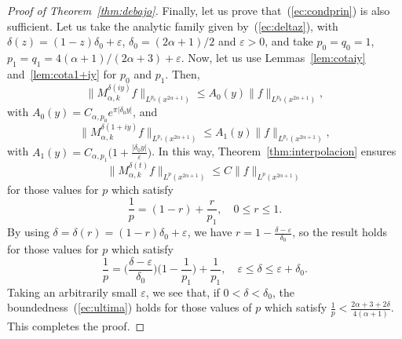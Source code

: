 \documentclass{amsart}
\theoremstyle{remark}
\newcommand{\BRkd}[1]{M_{\alpha,k}^{\delta(#1)}} %
\newcommand{\lpnorm}[2]{\|{#1}\|_{L^{#2}(x^{2\alpha+1})}}
\begin{document}
\begin{proof}[Proof of Theorem~\ref{thm:debajo}]
Finally, let us prove that~(\ref{ec:condprin}) is also sufficient.
Let us take the analytic family given by~(\ref{ec:deltaz}), with
$\delta(z) = (1-z)\delta_0+\varepsilon$,
$\delta_0 = (2\alpha+1)/2$ and $\varepsilon>0$,
and take $p_0 = q_0 = 1$, $p_1 = q_1 = 4(\alpha+1)/(2\alpha+3)+\varepsilon$.
Now, let us use Lemmas~\ref{lem:cotaiy} and~\ref{lem:cota1+iy} for
$p_0$ and $p_1$. Then,
\begin{equation*}
   \lpnorm{\BRkd{iy}f}{p_0} \le A_0(y)\lpnorm{f}{p_0},
\end{equation*}
with $A_0(y) = C_{\alpha,p_0} e^{\pi|\delta_0y|}$,
and
\begin{equation*}
    \lpnorm{\BRkd{1+iy}f}{p_1} \le A_1(y) \lpnorm{f}{p_1},
\end{equation*}
with
$A_1(y) = C_{\alpha,p_1} \big(1+\frac{|\delta_0y|}{\varepsilon}\big)$.
In this way, Theorem~\ref{thm:interpolacion} ensures
\begin{equation}
\label{ec:ultima}
    \lpnorm{\BRkd{t}f}p \le C \lpnorm{f}p
\end{equation}
for those values for $p$ which satisfy
\begin{equation*}
    \frac1p = (1-r) + \frac{r}{p_1}, \quad 0 \le r \le 1.
\end{equation*}
By using $\delta = \delta(r) = (1-r)\delta_0 + \varepsilon$, we have
$r = 1 - \frac{\delta-\varepsilon}{\delta_0}$, so the result holds for those
values for $p$ which satisfy
\begin{equation*}
    \frac1p = \Big( \frac{\delta-\varepsilon}{\delta_0} \Big)
      \Big( 1-\frac1{p_1} \Big) + \frac{1}{p_1},
    \quad \varepsilon \le \delta \le \varepsilon+\delta_0.
\end{equation*}
Taking an arbitrarily small $\varepsilon$, we see that, if $0 < \delta <
\delta_0$, the boundedness~(\ref{ec:ultima}) holds for those values of $p$
which satisfy
$\frac1p < \frac{2\alpha+3+2\delta}{4(\alpha+1)}$. This completes the proof.
\end{proof}

\end{document}
